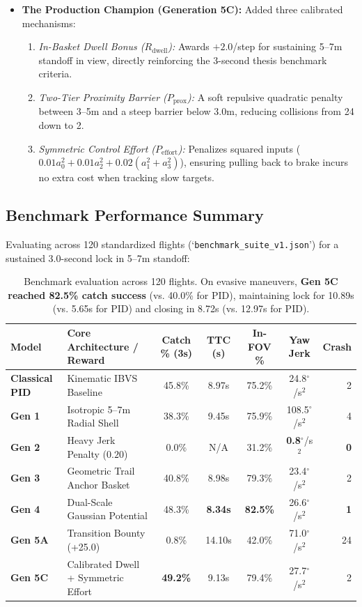 \documentclass[11pt,a4paper]{article}
\begin{document}
\begin{itemize}[leftmargin=1.5em, itemsep=0.4em]
    \item \textbf{The Production Champion (Generation 5C):} Added three calibrated mechanisms:
    \begin{enumerate}[leftmargin=1.2em, itemsep=0.1em]
        \item \textit{In-Basket Dwell Bonus ($R_{\text{dwell}}$):} Awards $+2.0$/step for sustaining 5--7m standoff in view, directly reinforcing the 3-second thesis benchmark criteria.
        \item \textit{Two-Tier Proximity Barrier ($P_{\text{prox}}$):} A soft repulsive quadratic penalty between 3--5m and a steep barrier below 3.0m, reducing collisions from 24 down to 2.
        \item \textit{Symmetric Control Effort ($P_{\text{effort}}$):} Penalizes squared inputs ($0.01 a_0^2 + 0.01 a_2^2 + 0.02(a_1^2 + a_3^2)$), ensuring pulling back to brake incurs no extra cost when tracking slow targets.
    \end{enumerate}
\end{itemize}

\subsection{Benchmark Performance Summary}
Evaluating across 120 standardized flights (`\texttt{benchmark\_suite\_v1.json}') for a sustained 3.0-second lock in 5--7m standoff:

\begin{table}[h!]
\centering
\small
\begin{tabularx}{\textwidth}{lXccccr}
\toprule
\textbf{Model} & \textbf{Core Architecture / Reward} & \textbf{Catch \% (3s)} & \textbf{TTC (s)} & \textbf{In-FOV \%} & \textbf{Yaw Jerk} & \textbf{Crash} \\
\midrule
\textbf{Classical PID} & Kinematic IBVS Baseline & 45.8\% & 8.97s & 75.2\% & 24.8$^\circ$/s$^2$ & 2 \\
\textbf{Gen 1} & Isotropic 5--7m Radial Shell & 38.3\% & 9.45s & 75.9\% & 108.5$^\circ$/s$^2$ & 4 \\
\textbf{Gen 2} & Heavy Jerk Penalty ($0.20$) & 0.0\% & N/A & 31.2\% & \textbf{0.8}$^\circ$/s$^2$ & \textbf{0} \\
\textbf{Gen 3} & Geometric Trail Anchor Basket & 40.8\% & 8.98s & 79.3\% & 23.4$^\circ$/s$^2$ & 2 \\
\textbf{Gen 4} & Dual-Scale Gaussian Potential & 48.3\% & \textbf{8.34s} & \textbf{82.5\%} & 26.6$^\circ$/s$^2$ & \textbf{1} \\
\textbf{Gen 5A} & Transition Bounty (+25.0) & 0.8\% & 14.10s & 42.0\% & 71.0$^\circ$/s$^2$ & 24 \\
\textbf{Gen 5C} & Calibrated Dwell + Symmetric Effort & \textbf{49.2\%} & 9.13s & 79.4\% & 27.7$^\circ$/s$^2$ & 2 \\
\bottomrule
\end{tabularx}
\caption{Benchmark evaluation across 120 flights. On evasive maneuvers, \textbf{Gen 5C reached 82.5\% catch success} (vs. 40.0\% for PID), maintaining lock for 10.89s (vs. 5.65s for PID) and closing in 8.72s (vs. 12.97s for PID).}
\label{tab:rl_benchmark}
\end{table}
\end{document}
